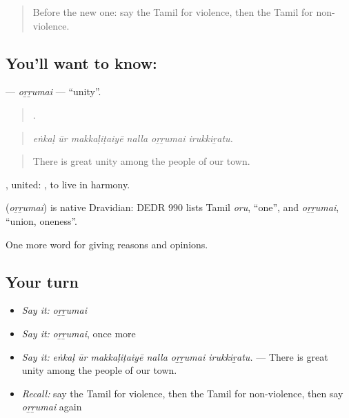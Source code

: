 \label{lesson:TA-C377-orrumai}



\begin{quote}
Before the new one: say the Tamil for violence, then the Tamil for non-violence.
\end{quote}

\subsection*{You'll want to know: }
\textbf{} — \emph{oṟṟumai} — \textquotedblleft{}unity\textquotedblright{}.

\begin{quote}
     .
\end{quote}

\begin{quote}
\emph{eṅkaḷ ūr makkaḷiṭaiyē nalla oṟṟumai irukkiṟatu.}
\end{quote}

\begin{quote}
There is great unity among the people of our town.
\end{quote}

, united:  , to live in harmony.

\begin{cousinweb}
\textbf{} (\emph{oṟṟumai}) is native Dravidian: DEDR 990 lists Tamil \emph{oru}, \textquotedblleft{}one\textquotedblright{}, and \emph{oṟṟumai}, \textquotedblleft{}union, oneness\textquotedblright{}.
\end{cousinweb}

\begin{grammarlens}[title={What you've built}]
One more word for giving reasons and opinions.
\end{grammarlens}

\subsection*{Your turn}
\begin{itemize}
\raggedright
  \item \emph{Say it:} \emph{oṟṟumai}
  \item \emph{Say it:} \emph{oṟṟumai}, once more
  \item \emph{Say it:} \emph{eṅkaḷ ūr makkaḷiṭaiyē nalla oṟṟumai irukkiṟatu.} — There is great unity among the people of our town.
  \item \emph{Recall:} say the Tamil for violence, then the Tamil for non-violence, then say \emph{oṟṟumai} again
\end{itemize}

